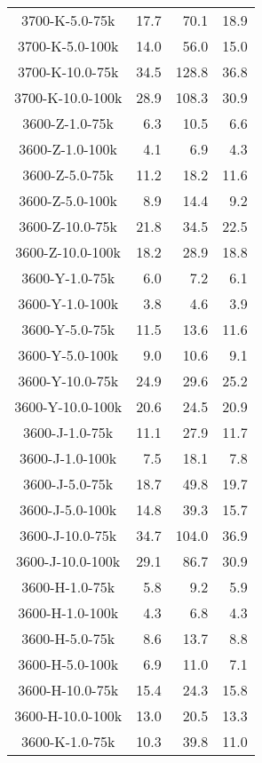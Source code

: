 \begin{longtable}{crrr}
    3700-K-5.0-75k   &   17.7 &   70.1 &   18.9 \\
    3700-K-5.0-100k  &   14.0 &   56.0 &   15.0 \\
    3700-K-10.0-75k  &   34.5 &  128.8 &   36.8 \\
    3700-K-10.0-100k &   28.9 &  108.3 &   30.9 \\
    3600-Z-1.0-75k   &    6.3 &   10.5 &    6.6 \\
    3600-Z-1.0-100k  &    4.1 &    6.9 &    4.3 \\
    3600-Z-5.0-75k   &   11.2 &   18.2 &   11.6 \\
    3600-Z-5.0-100k  &    8.9 &   14.4 &    9.2 \\
    3600-Z-10.0-75k  &   21.8 &   34.5 &   22.5 \\
    3600-Z-10.0-100k &   18.2 &   28.9 &   18.8 \\
    3600-Y-1.0-75k   &    6.0 &    7.2 &    6.1 \\
    3600-Y-1.0-100k  &    3.8 &    4.6 &    3.9 \\
    3600-Y-5.0-75k   &   11.5 &   13.6 &   11.6 \\
    3600-Y-5.0-100k  &    9.0 &   10.6 &    9.1 \\
    3600-Y-10.0-75k  &   24.9 &   29.6 &   25.2 \\
    3600-Y-10.0-100k &   20.6 &   24.5 &   20.9 \\
    3600-J-1.0-75k   &   11.1 &   27.9 &   11.7 \\
    3600-J-1.0-100k  &    7.5 &   18.1 &    7.8 \\
    3600-J-5.0-75k   &   18.7 &   49.8 &   19.7 \\
    3600-J-5.0-100k  &   14.8 &   39.3 &   15.7 \\
    3600-J-10.0-75k  &   34.7 &  104.0 &   36.9 \\
    3600-J-10.0-100k &   29.1 &   86.7 &   30.9 \\
    3600-H-1.0-75k   &    5.8 &    9.2 &    5.9 \\
    3600-H-1.0-100k  &    4.3 &    6.8 &    4.3 \\
    3600-H-5.0-75k   &    8.6 &   13.7 &    8.8 \\
    3600-H-5.0-100k  &    6.9 &   11.0 &    7.1 \\
    3600-H-10.0-75k  &   15.4 &   24.3 &   15.8 \\
    3600-H-10.0-100k &   13.0 &   20.5 &   13.3 \\
    3600-K-1.0-75k   &   10.3 &   39.8 &   11.0 \\

\end{longtable}
